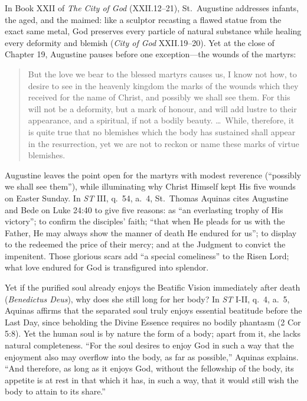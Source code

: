 In Book XXII of \textit{The City of God} (XXII.12--21), St.\ Augustine addresses infants, the aged, and the maimed: like a sculptor recasting a flawed statue from the exact same metal, God preserves every particle of natural substance while healing every deformity and blemish (\textit{City of God} XXII.19--20). Yet at the close of Chapter 19, Augustine pauses before one exception---the wounds of the martyrs:

\begin{quote}
But the love we bear to the blessed martyrs causes us, I know not how, to desire to see in the heavenly kingdom the marks of the wounds which they received for the name of Christ, and possibly we shall see them. For this will not be a deformity, but a mark of honour, and will add lustre to their appearance, and a spiritual, if not a bodily beauty. \dots\ While, therefore, it is quite true that no blemishes which the body has sustained shall appear in the resurrection, yet we are not to reckon or name these marks of virtue blemishes.
\end{quote}

Augustine leaves the point open for the martyrs with modest reverence (``possibly we shall see them''), while illuminating why Christ Himself kept His five wounds on Easter Sunday. In \textit{ST} III, q.\ 54, a.\ 4, St.\ Thomas Aquinas cites Augustine and Bede on Luke 24:40 to give five reasons: as ``an everlasting trophy of His victory''; to confirm the disciples' faith; ``that when He pleads for us with the Father, He may always show the manner of death He endured for us''; to display to the redeemed the price of their mercy; and at the Judgment to convict the impenitent. Those glorious scars add ``a special comeliness'' to the Risen Lord; what love endured for God is transfigured into splendor.

Yet if the purified soul already enjoys the Beatific Vision immediately after death (\textit{Benedictus Deus}), why does she still long for her body? In \textit{ST} I-II, q.\ 4, a.\ 5, Aquinas affirms that the separated soul truly enjoys essential beatitude before the Last Day, since beholding the Divine Essence requires no bodily phantasm (2 Cor 5:8). Yet the human soul is by nature the form of a body; apart from it, she lacks natural completeness. ``For the soul desires to enjoy God in such a way that the enjoyment also may overflow into the body, as far as possible,'' Aquinas explains. ``And therefore, as long as it enjoys God, without the fellowship of the body, its appetite is at rest in that which it has, in such a way, that it would still wish the body to attain to its share.''

